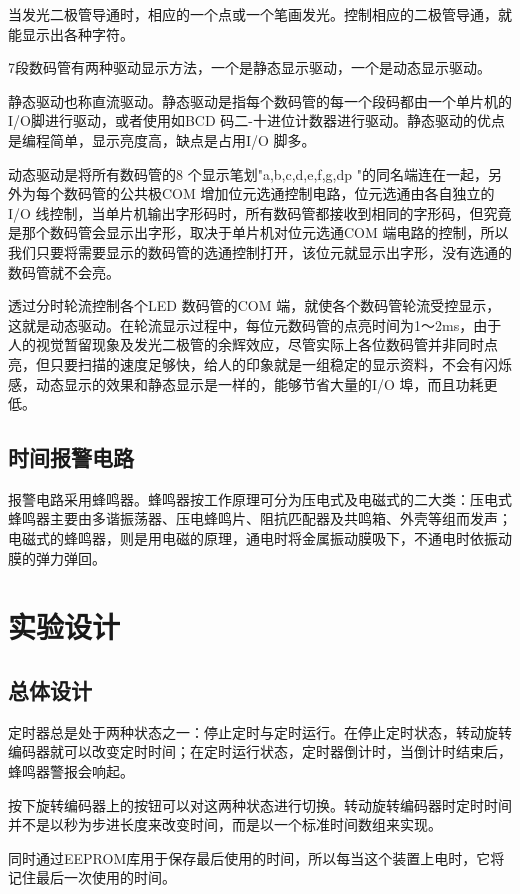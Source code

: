 \documentclass{../source/Experiment}
\begin{document}
        当发光二极管导通时，相应的一个点或一个笔画发光。控制相应的二极管导通，就能显示出各种字符。

        7段数码管有两种驱动显示方法，一个是静态显示驱动，一个是动态显示驱动。

        静态驱动也称直流驱动。静态驱动是指每个数码管的每一个段码都由一个单片机的I/O脚进行驱动，或者使用如BCD 码二-十进位计数器进行驱动。静态驱动的优点是编程简单，显示亮度高，缺点是占用I/O 脚多。

        动态驱动是将所有数码管的8 个显示笔划"a,b,c,d,e,f,g,dp "的同名端连在一起，另外为每个数码管的公共极COM 增加位元选通控制电路，位元选通由各自独立的I/O 线控制，当单片机输出字形码时，所有数码管都接收到相同的字形码，但究竟是那个数码管会显示出字形，取决于单片机对位元选通COM 端电路的控制，所以我们只要将需要显示的数码管的选通控制打开，该位元就显示出字形，没有选通的数码管就不会亮。

        透过分时轮流控制各个LED 数码管的COM 端，就使各个数码管轮流受控显示，这就是动态驱动。在轮流显示过程中，每位元数码管的点亮时间为1～2ms，由于人的视觉暂留现象及发光二极管的余辉效应，尽管实际上各位数码管并非同时点亮，但只要扫描的速度足够快，给人的印象就是一组稳定的显示资料，不会有闪烁感，动态显示的效果和静态显示是一样的，能够节省大量的I/O 埠，而且功耗更低。
        \subsection{时间报警电路}
        报警电路采用蜂鸣器。蜂鸣器按工作原理可分为压电式及电磁式的二大类：压电式蜂鸣器主要由多谐振荡器、压电蜂鸣片、阻抗匹配器及共鸣箱、外壳等组而发声；电磁式的蜂鸣器，则是用电磁的原理，通电时将金属振动膜吸下，不通电时依振动膜的弹力弹回。
        
    \section{实验设计}
        \subsection{总体设计}
        定时器总是处于两种状态之一：停止定时与定时运行。在停止定时状态，转动旋转编码器就可以改变定时时间；在定时运行状态，定时器倒计时，当倒计时结束后，蜂鸣器警报会响起。

        按下旋转编码器上的按钮可以对这两种状态进行切换。转动旋转编码器时定时时间并不是以秒为步进长度来改变时间，而是以一个标准时间数组来实现。

        同时通过EEPROM库用于保存最后使用的时间，所以每当这个装置上电时，它将记住最后一次使用的时间。
\end{document}

